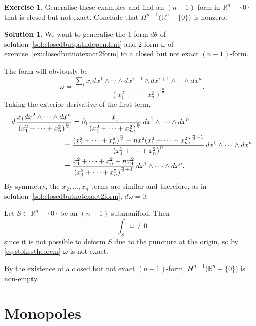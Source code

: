 \documentclass[11pt, a4paper]{report}
\theoremstyle{definition}
\newtheorem{exercise}{Exercise}[part]
\newtheorem{solution}{Solution}[part]
\newenvironment{ex}{\begin{exercise}}{\end{exercise}\pagebreak[1]}
\newenvironment{sol}{\begin{solution}}{\end{solution}\pagebreak[3]}
\newcommand*{\op}[1]{\ensuremath\mathop{}\mathopen{}#1}
\renewcommand*{\d}{\op{d}}
\begin{document}
\begin{ex}

Generalise these examples and find an $(n-1)$-form in $\mathbb{R}^n - \{0\}$ that is closed but not exact.
Conclude that $H^{n - 1} \bigl( \mathbb{R}^{n} - \{0\} \bigr)$ is nonzero.

\end{ex}

\begin{sol}

We want to generalise the 1-form $d\theta$ of solution~\ref{sol:closedbutpathdependent} and 2-form $\omega$ of exercise~\ref{ex:closedbutnotexact2form} to a closed but not exact $(n-1)$-form.

The form will obviously be
\[
    \omega = \frac{\sum_i x_i dx^1 \wedge \cdots \wedge dx^{i - 1} \wedge dx^{i + 1} \wedge \cdots \wedge dx^n}
                  {{(x_1^2 + \cdots + x_n^2)}^\frac{n}{2}}.
\]
Taking the exterior derivative of the first term,
\begin{align*}
    d \, \frac{x_1 dx^2 \wedge \cdots \wedge dx^n}{{(x_1^2 + \cdots + x_n^2)}^\frac{n}{2}}
        &= \partial_1 \frac{x_1}{{(x_1^2 + \cdots + x_n^2)}^\frac{n}{2}} \d x^1 \wedge \cdots \wedge dx^n \\
        ={}& \frac{{(x_1^2 + \cdots + x_n^2)}^\frac{n}{2} - n x_1^2 {(x_1^2 + \cdots + x_n^2)}^{\frac{n}{2} - 1}}
                  {{(x_1^2 + \cdots + x_n^2)}^n} \d x^1 \wedge \cdots \wedge dx^n \\
        ={}& \frac{x_1^2 + \cdots + x_n^2 - n x_1^2}
                  {{(x_1^2 + \cdots + x_n^2)}^{\frac{n}{2} + 1}} \d x^1 \wedge \cdots \wedge dx^n.
\end{align*}
By symmetry, the $x_2, \ldots, x_n$ terms are similar and therefore, as in solution~\ref{sol:closedbutnotexact2form}, $d\omega = 0$.

Let $S \subset \mathbb{R}^n - \{0\}$ be an $(n - 1)$-submanifold. Then
\[
    \int_S \omega \neq 0
\]
since it is not possible to deform $S$ due to the puncture at the origin, so by \ref{eq:stokestheorem} $\omega$ is not exact. %

By the existence of a closed but not exact $(n - 1)$-form, $H^{n - 1} \bigl( \mathbb{R}^n - \{0\} \bigr)$ is non-empty.

\end{sol}

\section{Monopoles}
\end{document}
